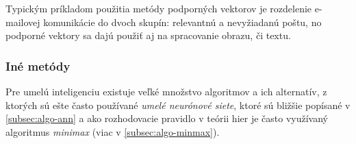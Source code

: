 Typickým príkladom použitia metódy podporných vektorov je rozdelenie e-mailovej komunikácie do dvoch skupín: relevantnú
a nevyžiadanú poštu, no podporné vektory sa dajú použiť aj na spracovanie obrazu, či textu.

\subsubsection{Iné metódy}

Pre umelú inteligenciu existuje veľké množstvo algoritmov a ich alternatív, z ktorých sú ešte často používané
\emph{umelé neurónové siete}, ktoré sú bližšie popísané v \autoref{subsec:algo-ann} a ako rozhodovacie pravidlo v
teórii hier je často využívaný algoritmus \emph{minimax} (viac v \autoref{subsec:algo-minmax}).
